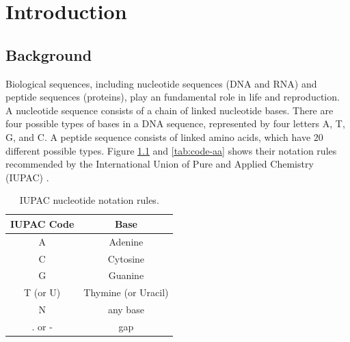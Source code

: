 \chapter{Introduction}\label{chap:Introduction}

\section{Background}

Biological sequences, including nucleotide sequences (DNA and RNA) and peptide sequences (proteins), play an fundamental role in life and reproduction. A nucleotide sequence consists of a chain of linked nucleotide bases. There are four possible types of bases in a DNA sequence, represented by four letters A, T, G, and C. A peptide sequence consists of linked amino acids, which have 20 different possible types. Figure \ref{tab:code-dna} and \ref{tab:code-aa} shows their notation rules recommended by the International Union of Pure and Applied Chemistry (IUPAC) \cite{Cornish-Bowden:1985lr}.

\begin{table}[hbt]
\centering\small
\caption[IUPAC Nucleotide Notation Rules]{IUPAC nucleotide notation rules.}\label{tab:code-dna}
\begin{tabular}{cc} \toprule
  IUPAC Code  & Base                \\ \hline
  A           & Adenine             \\
  C           & Cytosine            \\
  G           & Guanine             \\
  T (or U)    & Thymine (or Uracil) \\
  N           & any base            \\
  . or -      & gap                 \\ \bottomrule
\end{tabular}
\end{table}

